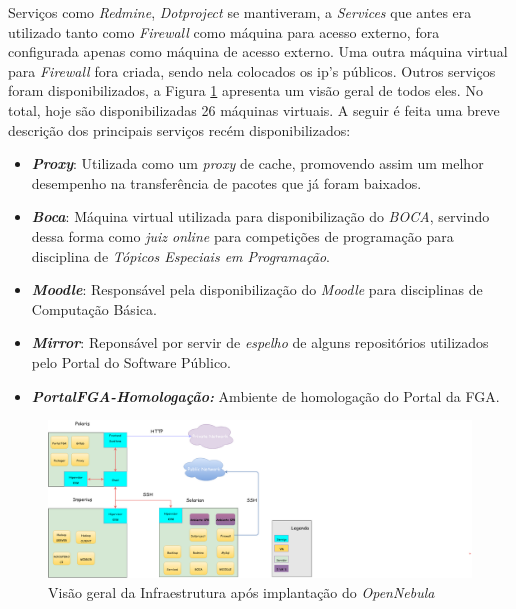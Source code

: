 Serviços como \textit{Redmine}, \textit{Dotproject} se mantiveram, a \textit{Services} que antes era utilizado tanto como \textit{Firewall} como máquina para acesso externo, fora configurada apenas como máquina de acesso externo. Uma outra máquina virtual para \textit{Firewall} fora criada, sendo nela colocados os ip's públicos. Outros serviços foram disponibilizados, a Figura \ref{fig:vm_infra} apresenta um visão geral de todos eles. No total, hoje são disponibilizadas 26 máquinas virtuais. A seguir é feita uma breve descrição dos principais serviços recém disponibilizados:

\begin{itemize}
\item \textbf{\textit{Proxy}}: Utilizada como um \textit{proxy} de cache, promovendo assim um melhor desempenho na transferência de pacotes que já foram baixados.
\item \textbf{\textit{Boca}}: Máquina virtual utilizada para disponibilização do \textit{BOCA}, servindo dessa forma como \textit{juiz online} para competições de programação para disciplina de \textit{Tópicos Especiais em Programação}.
\item \textbf{\textit{Moodle}}: Responsável pela disponibilização do \textit{Moodle} para disciplinas de Computação Básica.
\item \textbf{\textit{Mirror}}: Reponsável por servir de \textit{espelho} de alguns repositórios utilizados pelo Portal do Software Público.
\item \textbf{\textit{PortalFGA-Homologação:}} Ambiente de homologação do Portal da FGA.

\end{itemize}


\begin{figure}[!h]
\centering
\includegraphics [keepaspectratio=true,scale=0.4]{figuras/vm_infra.eps}
\caption{Visão geral da Infraestrutura após implantação do \textit{OpenNebula}}
\label{fig:vm_infra}
\end{figure}

